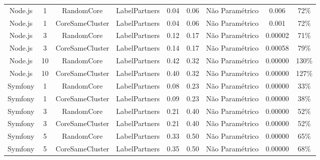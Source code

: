 \documentclass[12pt,openany,oneside,a4paper,english,brazil]{abntbibufjf}
\begin{document}
\begin{table}[htbp]
\begin{center}
{\begin{tabular}{|c|c|c|c|c|c|c|c|c|}
   Node.js          & 1          & RandomCore        & LabelPartners     & 0.04             & 0.06              & Não Paramétrico        & 0.006            & 72\%               \\
   Node.js          & 1          & CoreSameCluster   & LabelPartners     & 0.04             & 0.06              & Não Paramétrico        & 0.001            & 72\%               \\
   Node.js          & 3          & RandomCore        & LabelPartners     & 0.12             & 0.17             & Não Paramétrico        & 0.00002          & 71\%               \\
   Node.js          & 3          & CoreSameCluster   & LabelPartners     & 0.14             & 0.17             & Não Paramétrico        & 0.00058          & 79\%               \\
   Node.js          & 10         & RandomCore        & LabelPartners     & 0.42             & 0.32             & Não Paramétrico        & 0.00000          & 130\%              \\
   Node.js          & 10         & CoreSameCluster   & LabelPartners     & 0.40             & 0.32             & Não Paramétrico        & 0.00000          & 127\%              \\
   Symfony          & 1          & RandomCore        & LabelPartners     & 0.08             & 0.23             & Não Paramétrico        & 0.00000          & 33\%               \\
   Symfony          & 1          & CoreSameCluster   & LabelPartners     & 0.09             & 0.23             & Não Paramétrico        & 0.00000          & 38\%               \\
   Symfony          & 3          & RandomCore        & LabelPartners     & 0.21             & 0.40             & Não Paramétrico        & 0.00000          & 52\%               \\
   Symfony          & 3          & CoreSameCluster   & LabelPartners     & 0.21             & 0.40             & Não Paramétrico        & 0.00000          & 52\%               \\
   Symfony          & 5          & RandomCore        & LabelPartners     & 0.33             & 0.50             & Não Paramétrico        & 0.00000          & 65\%               \\
   Symfony          & 5          & CoreSameCluster   & LabelPartners     & 0.35             & 0.50             & Não Paramétrico        & 0.00000          & 68\%               \\

\end{tabular}}
\end{center}
\end{table}
\end{document}
